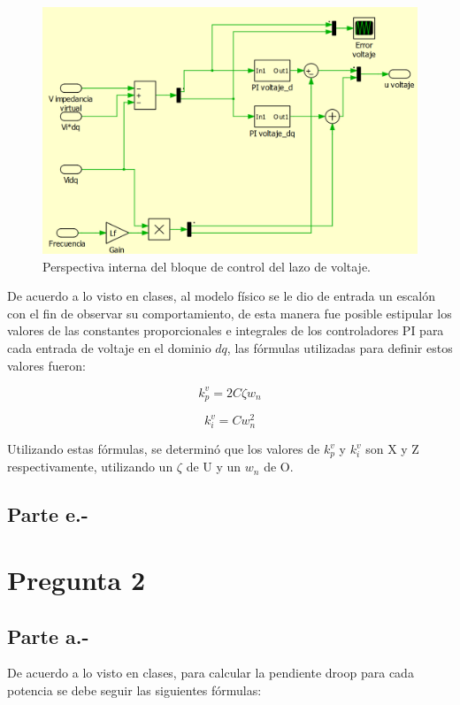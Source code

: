 \begin{figure}
   \centering
   \includegraphics[width=0.5\linewidth]{Tarea 1/report/imagenes/p1d/vcl bloque interno.png}
   \caption{Perspectiva interna del bloque de control del lazo de voltaje.}
   \label{vcl interno}
\end{figure}

De acuerdo a lo visto en clases, al modelo físico se le dio de entrada un escalón con el fin de observar su comportamiento, de esta manera fue posible estipular los valores de las constantes proporcionales e integrales de los controladores PI para cada entrada de voltaje en el dominio $dq$, las fórmulas utilizadas para definir estos valores fueron:

\begin{equation}
    k_p^v = 2C\zeta w_{n}
\end{equation}

\begin{equation}
    k_i^v = Cw_{n}^2
\end{equation}

Utilizando estas fórmulas, se determinó que los valores de $k_p^v$ y $k_i^v$ son X y Z respectivamente, utilizando un $\zeta$ de U y un $w_{n}$ de O.

\subsection{Parte e.-}



\section{Pregunta 2}

\subsection{Parte a.-}

De acuerdo a lo visto en clases, para calcular la pendiente droop para cada potencia se debe seguir las siguientes fórmulas:

